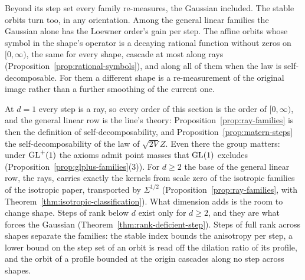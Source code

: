Beyond its step set every family re-measures, the Gaussian included. The stable orbits turn
too, in any orientation. Among the general linear families the Gaussian alone has the Loewner
order's gain per step. The affine orbits whose symbol in the shape's operator is a decaying rational function without
zeros on $[0, \infty)$, the same for every shape, cascade at most along rays (Proposition~\ref{prop:rational-symbols}), and along all of them
when the law is self-decomposable. For them a different shape is a re-measurement of the
original image rather than a further smoothing of the current one.

\begin{remark}\label{rem:landscape-line}
At $d = 1$ every step is a ray, so every order of this section is the order of $[0, \infty)$, and the
general linear row is the line's theory: Proposition~\ref{prop:ray-families} is then the definition of
self-decomposability, and Proposition~\ref{prop:matern-steps} the self-decomposability of the law of
$\sqrt{2V}Z$. Even there the group matters: under $\mathrm{GL}^+(1)$ the axioms admit point masses that $\mathrm{GL}(1)$
excludes (Proposition~\ref{prop:glplus-families}(3)). For $d \ge 2$ the base of the general linear row,
the rays, carries exactly the kernels from scale zero of the isotropic families of the isotropic paper,
transported by $\Sigma^{1/2}$ (Proposition~\ref{prop:ray-families}, with
Theorem~\ref{thm:isotropic-classification}). What dimension adds is the room to change shape. Steps of
rank below $d$ exist only for $d \ge 2$, and they are what forces the Gaussian
(Theorem~\ref{thm:rank-deficient-step}). Steps of full rank across shapes separate the families: the
stable index bounds the anisotropy per step, a lower bound on the step set of an orbit is read off the
dilation ratio of its profile, and the orbit of a profile bounded at the origin cascades along no step
across shapes.
\end{remark}
